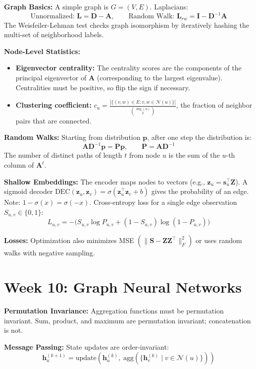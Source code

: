 \documentclass[12pt]{article}
\begin{document}
\textbf{Graph Basics:} A simple graph is $G=(V,E)$. Laplacians:
\[
\text{Unnormalized: } \bm{L} = \bm{D} - \bm{A}, \qquad \text{Random Walk: } \bm{L}_{rw} = \bm{I} - \bm{D}^{-1}\bm{A}
\]
The Weisfeiler-Lehman test checks graph isomorphism by iteratively hashing the multi-set of neighborhood labels.

\textbf{Node-Level Statistics:}
\begin{itemize}
  \item \textbf{Eigenvector centrality:} The centrality scores are the components of the principal eigenvector of $\bm{A}$ (corresponding to the largest eigenvalue). Centralities must be positive, so flip the sign if necessary.
  \item \textbf{Clustering coefficient:} $c_u = \frac{|\{(v,w)\in E : v,w\in\mathcal{N}(u)\}|}{\binom{\deg(u)}{2}}$, the fraction of neighbor pairs that are connected.
\end{itemize}

\textbf{Random Walks:} Starting from distribution $\bm{p}$, after one step the distribution is:
\[
\bm{A}\bm{D}^{-1}\bm{p} = \bm{P}\bm{p}, \qquad \bm{P} = \bm{A}\bm{D}^{-1}
\]
The number of distinct paths of length $t$ from node $u$ is the sum of the $u$-th column of $\bm{A}^t$.

\textbf{Shallow Embeddings:} The encoder maps nodes to vectors (e.g., $\bm{z}_u = \bm{s}_u^\top \bm{Z}$). A sigmoid decoder $\text{DEC}(\bm{z}_u, \bm{z}_v) = \sigma(\bm{z}_u^\top\bm{z}_v + b)$ gives the probability of an edge. Note: $1 - \sigma(x) = \sigma(-x)$. Cross-entropy loss for a single edge observation $S_{u,v} \in \{0,1\}$:
\[
L_{u,v} = -\bigl(S_{u,v}\log P_{u,v} + (1-S_{u,v})\log(1-P_{u,v})\bigr)
\]

\textbf{Losses:} Optimization also minimizes MSE $(\|\bm{S} - \bm{Z}\bm{Z}^\top\|_F^2)$ or uses random walks with negative sampling.

\section*{Week 10: Graph Neural Networks}

\textbf{Permutation Invariance:} Aggregation functions must be permutation invariant. Sum, product, and maximum are permutation invariant; concatenation is not.

\textbf{Message Passing:} State updates are order-invariant:
\[
\bm{h}_u^{(k+1)} = \text{update}\!\left(\bm{h}_u^{(k)},\; \text{agg}\!\left(\{\bm{h}_v^{(k)} \mid v \in \mathcal{N}(u)\}\right)\right)
\]
\end{document}

